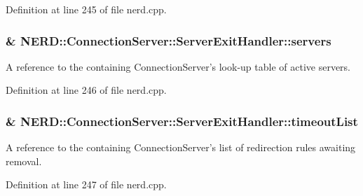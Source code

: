 \-Definition at line 245 of file nerd.\-cpp.

\hypertarget{classNERD_1_1ConnectionServer_1_1ServerExitHandler_a9155fa7acc10d3e954d5998624c80bd7}{
\subsubsection[{servers}]{\& {\bf \-N\-E\-R\-D\-::\-Connection\-Server\-::\-Server\-Exit\-Handler\-::servers}}}
\label{classNERD_1_1ConnectionServer_1_1ServerExitHandler_a9155fa7acc10d3e954d5998624c80bd7}


\-A reference to the containing \-Connection\-Server's look-\/up table of active servers. 



\-Definition at line 246 of file nerd.\-cpp.

\hypertarget{classNERD_1_1ConnectionServer_1_1ServerExitHandler_ac95b8019ae4312f278e28808e92b77a1}{
\subsubsection[{timeout\-List}]{\& {\bf \-N\-E\-R\-D\-::\-Connection\-Server\-::\-Server\-Exit\-Handler\-::timeout\-List}}}
\label{classNERD_1_1ConnectionServer_1_1ServerExitHandler_ac95b8019ae4312f278e28808e92b77a1}


\-A reference to the containing \-Connection\-Server's list of redirection rules awaiting removal. 



\-Definition at line 247 of file nerd.\-cpp.

